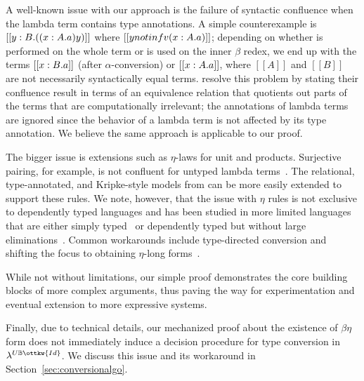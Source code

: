 \documentclass[acmsmall,screen=true,
\ifpublic review=false\else,review=true\fi
  ,anonymous=\ifanonymous true\else false\fi]{acmart}
\newcommand{\lang}{$\lambda^{U\mathbb{B}\ottkw{Id}}$\xspace}
\newcommand{\scw}[1]{}
\begin{document}
A well-known issue with our approach is the failure of syntactic
confluence when the lambda term contains type annotations. A simple
counterexample is $[[\- y : B . ((\- x : A . a) y)]]$ where $[[y notin
fv (\- x : A . a)]]$; depending on
whether  is performed on the whole term or
 is used on the inner $\beta$ redex, we end up with the
terms $[[\- x : B . a]]$ (after $\alpha$-conversion) or $[[\- x : A . a]]$, where $[[A]]$ and $[[B]]$ are not
necessarily syntactically equal terms. \citet{choudhury:ddc} resolve
this problem by stating their confluence result in terms of an
equivalence relation that quotients out parts of the terms that are
computationally irrelevant; the annotations of lambda terms are
ignored since the behavior of a lambda term is not affected by its
type annotation. We believe the same approach is applicable to our
proof.

The bigger issue is extensions such as $\eta$-laws for unit and
products. Surjective pairing, for example, is not confluent for untyped lambda
terms~\cite{KLOP198997}. The relational, type-annotated, and Kripke-style models from
\citet{nbeincoq,decagda,martin-lof-a-la-coq} can be more easily
extended to support these rules.
We note, however, that the issue with $\eta$ rules is not exclusive to dependently
typed languages and has been studied in more limited languages that
are either simply
typed~\citep{pierce2004advanced,pfenning1997computation} or
dependently typed but without large
eliminations~\citep{harper2005equivalence,
abel2005untypedconvsurjective}. Common workarounds include
type-directed conversion and shifting the focus to obtaining
$\eta$-long forms~\cite{Abel12}.

While not without limitations, our simple proof demonstrates the core
building blocks of more complex arguments, thus paving the way for experimentation
and eventual extension to more expressive systems.\scw{I tried to reword your
sentence, but I am still not happy with it.}

\scw{Is this specific to $\eta$? Or is this also true for $\beta$? Can we move this
sentence elsewhere? I'd like to use the previous sentence as a conclusion for
this section.}
Finally, due to technical
details, our mechanized proof about the existence of $\beta\eta$ form does not
immediately induce a decision procedure for type conversion in
\lang{}. We discuss this issue and its workaround in
Section~\ref{sec:conversionalgo}.
\end{document}
